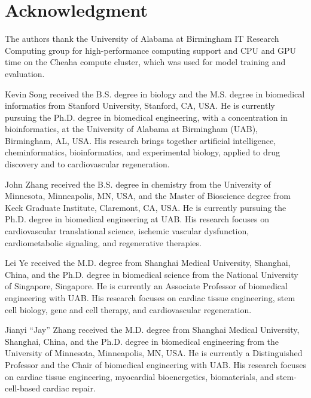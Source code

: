 \documentclass{ieeeaccess}
\begin{document}
\section*{Acknowledgment}
The authors thank the University of Alabama at Birmingham IT Research Computing
group for high-performance computing support and CPU and GPU time on the Cheaha
compute cluster, which was used for model training and evaluation.




\begin{IEEEbiographynophoto}{Kevin Song}
received the B.S. degree in biology and the M.S. degree in biomedical
informatics from Stanford University, Stanford, CA, USA. He is currently
pursuing the Ph.D. degree in biomedical engineering, with a concentration in
bioinformatics, at the University of Alabama at Birmingham (UAB), Birmingham,
AL, USA. His research brings together artificial intelligence, cheminformatics,
bioinformatics, and experimental biology, applied to drug discovery and to
cardiovascular regeneration.
\end{IEEEbiographynophoto}

\begin{IEEEbiographynophoto}{John Zhang}
received the B.S. degree in chemistry from the University of Minnesota,
Minneapolis, MN, USA, and the Master of Bioscience degree from Keck Graduate
Institute, Claremont, CA, USA. He is currently pursuing the Ph.D. degree in
biomedical engineering at UAB. His research focuses on cardiovascular
translational science, ischemic vascular dysfunction, cardiometabolic
signaling, and regenerative therapies.
\end{IEEEbiographynophoto}

\begin{IEEEbiographynophoto}{Lei Ye}
received the M.D. degree from Shanghai Medical University, Shanghai, China, and
the Ph.D. degree in biomedical science from the National University of
Singapore, Singapore. He is currently an Associate Professor of biomedical
engineering with UAB. His research focuses on cardiac tissue engineering, stem
cell biology, gene and cell therapy, and cardiovascular regeneration.
\end{IEEEbiographynophoto}

\begin{IEEEbiographynophoto}{Jianyi ``Jay'' Zhang}
received the M.D. degree from Shanghai Medical University, Shanghai, China, and
the Ph.D. degree in biomedical engineering from the University of Minnesota,
Minneapolis, MN, USA. He is currently a Distinguished Professor and the Chair
of biomedical engineering with UAB. His research focuses on cardiac tissue
engineering, myocardial bioenergetics, biomaterials, and stem-cell-based
cardiac repair.
\end{IEEEbiographynophoto}

\EOD
\end{document}
